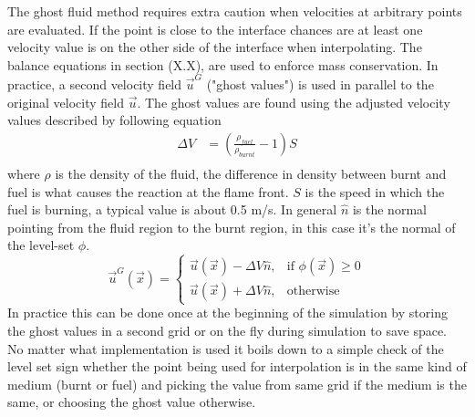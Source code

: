 \label{sec:method_two_phase_flow}
The ghost fluid method requires extra caution when velocities at arbitrary points are evaluated. If the point is close to the interface chances are at least one velocity value is on the other side of the interface when interpolating. The balance equations in section (X.X), are used to enforce mass conservation. In practice, a second velocity field \begin{math}\vec{u}^{ G}\end{math} ("ghost values") is used in parallel to the original velocity field \begin{math}\vec{u}\end{math}. The ghost values are found using the adjusted velocity values described by following equation
\begin{align}
\Delta V  & = (\frac{\rho_{fuel}}{\rho_{burnt}} - 1)S \\
\end{align}
where $\rho $ is the density of the fluid, the difference in density between burnt and fuel is what causes the reaction at the flame front. $S$ is the speed in which the fuel is burning, a typical value is about 0.5 m/s. In general $ \hat n$ is the normal pointing from the fluid region to the burnt region, in this case it's the normal of the level-set $ \phi $.
\begin{equation}
    \vec{u}^{G}(\vec{x})= 
\begin{cases}
    \vec{u}(\vec{x})-\Delta V \hat{n},& \text{if } \phi (\vec{x}) \geq 0\\
    \vec{u}(\vec{x})+\Delta V \hat{n},                    & \text{otherwise}
\end{cases}
\end{equation}
In practice this can be done once at the beginning of the simulation by storing the ghost values in a second grid or on the fly during simulation to save space. No matter what implementation is used it boils down to a simple check of the level set sign whether the point being used for interpolation is in the same kind of medium (burnt or fuel) and picking the value from same grid if the medium is the same, or choosing the ghost value otherwise. 